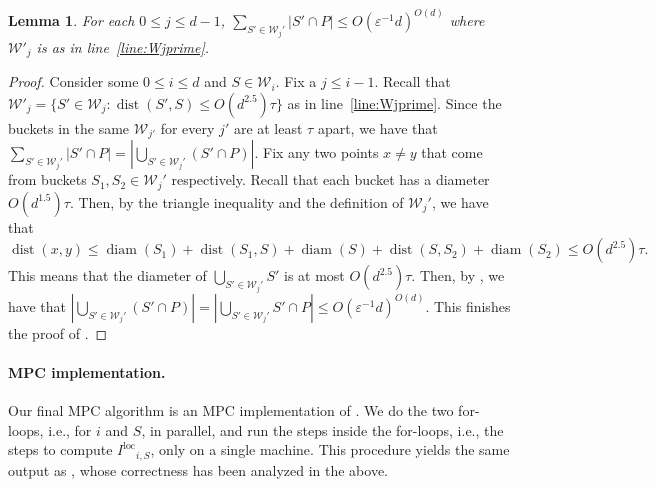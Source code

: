 \documentclass[11pt,letterpaper]{article}
\theoremstyle{plain}
\newtheorem{lemma}[theorem]{Lemma}
\theoremstyle{definition}
\theoremstyle{remark}
\DeclareMathOperator{\dist}{dist}
\DeclareMathOperator{\diam}{diam}
\newcommand{\Iloc}{\ensuremath{I^{\mathrm{loc}}}\xspace}
\begin{document}
\begin{lemma}
\label{lemma:relevant_buckets}
    For each $0\leq j\leq d-1$, $\sum_{S'\in \mathcal{W}_{j}'} |S'\cap P|\leq O(\varepsilon^{-1}d)^{O(d)}$ where $\mathcal{W}'_{j}$ is as in  line~\ref{line:Wjprime}.  
\end{lemma}
\begin{proof}
Consider some $0\leq i\leq d$ and $S\in \mathcal{W}_{i}$. 
Fix a $j\leq i-1$. 
Recall that $\mathcal{W}'_{j} = \{S'\in \mathcal{W}_{j}: \dist(S', S)\leq O(d^{2.5})\tau \}$ as in line~\ref{line:Wjprime}. 
Since the buckets in the same $\mathcal{W}_{j'}$ for every $j'$ are at least $\tau$ apart, we have that $\sum_{S'\in \mathcal{W}_{j}'} |S'\cap P| = |\bigcup_{S'\in \mathcal{W}_{j}'} (S'\cap P)|$. 
Fix any two points $x\neq y$ that come from buckets $S_{1}, S_{2}\in \mathcal{W}_{j}'$ respectively. 
Recall that each bucket has a diameter $O(d^{1.5})\tau$. 
Then, by the triangle inequality and the definition of $\mathcal{W}_{j}'$, we have that 
$$\dist(x, y)\leq \diam(S_{1}) + \dist(S_{1}, S) + \diam(S) + \dist(S, S_{2}) + \diam(S_{2})\leq O(d^{2.5})\tau.$$
This means that the diameter of $\bigcup_{S'\in \mathcal{W}_{j}'} S'$ is at most $O(d^{2.5})\tau$. 
Then, by , we have that $|\bigcup_{S'\in \mathcal{W}_{j}'} (S'\cap P)| = |\bigcup_{S'\in \mathcal{W}_{j}'} S' \cap P|\leq O(\varepsilon^{-1}d)^{O(d)}$.
This finishes the proof of .  
\end{proof}





\paragraph{MPC implementation.}
    Our final MPC algorithm is an MPC implementation of .
    We do the two for-loops, i.e., for $i$ and $S$, in parallel,
    and run the steps inside the for-loops, i.e., the steps to compute $\Iloc_{i, S}$, only on a single machine.
    This procedure yields the same output as , whose correctness has been analyzed in the above.
\end{document}
